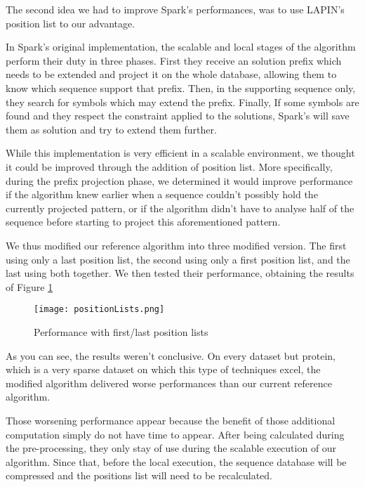 \documentclass{eplmastersthesis}
\begin{document}
The second idea we had to improve Spark's performances, was to use LAPIN's position list to our advantage. \newline

In Spark's original implementation, the scalable and local stages of the algorithm perform their duty in three phases. First they receive an solution prefix which needs to be extended and project it on the whole database, allowing them to know which sequence support that prefix. Then, in the supporting sequence only, they search for symbols which may extend the prefix. Finally, If some symbols are found and they respect the constraint applied to the solutions, Spark's will save them as solution and try to extend them further. \newline

While this implementation is very efficient in a scalable environment, we thought it could be improved through the addition of position list. More specifically, during the prefix projection phase, we determined it would improve performance if the algorithm knew earlier when a sequence couldn't possibly hold the currently projected pattern, or if the algorithm didn't have to analyse half of the sequence before starting to project this aforementioned pattern. \newline

We thus modified our reference algorithm into three modified version. The first using only a last position list, the second using only a first position list, and the last using both together. We then tested their performance, obtaining the results of Figure \ref{fig:positionListPerf} \newline

\begin{figure}[h]
  \centering
  \texttt{[image: positionLists.png]}
  \caption{Performance with first/last position lists}
  \label{fig:positionListPerf}
\end{figure}

As you can see, the results weren't conclusive. On every dataset but protein, which is a very sparse dataset on which this type of techniques excel, the modified algorithm delivered worse performances than our current reference algorithm. \newline

Those worsening performance appear because the benefit of those additional computation simply do not have time to appear. After being calculated during the pre-processing, they only stay of use during the scalable execution of our algorithm. Since that, before the local execution, the sequence database will be compressed and the positions list will need to be recalculated. \newline
\end{document}
